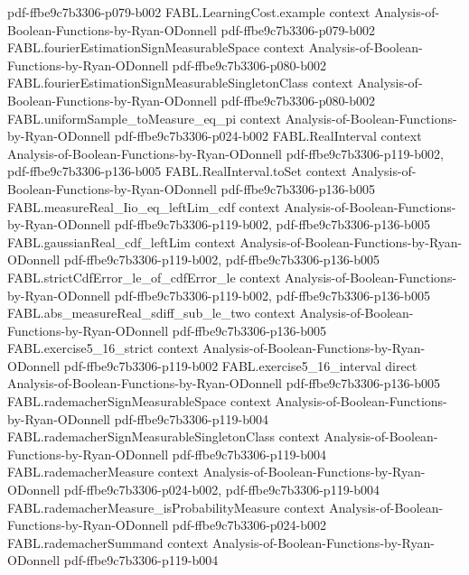 \begin{theorem}
  {pdf-ffbe9c7b3306-p079-b002}
\proofstep
  {FABL.LearningCost.example}
  {context}
  {Analysis-of-Boolean-Functions-by-Ryan-ODonnell}
  {pdf-ffbe9c7b3306-p079-b002}
\proofstep
  {FABL.fourierEstimationSignMeasurableSpace}
  {context}
  {Analysis-of-Boolean-Functions-by-Ryan-ODonnell}
  {pdf-ffbe9c7b3306-p080-b002}
\proofstep
  {FABL.fourierEstimationSignMeasurableSingletonClass}
  {context}
  {Analysis-of-Boolean-Functions-by-Ryan-ODonnell}
  {pdf-ffbe9c7b3306-p080-b002}
\proofstep
  {FABL.uniformSample_toMeasure_eq_pi}
  {context}
  {Analysis-of-Boolean-Functions-by-Ryan-ODonnell}
  {pdf-ffbe9c7b3306-p024-b002}
\proofstep
  {FABL.RealInterval}
  {context}
  {Analysis-of-Boolean-Functions-by-Ryan-ODonnell}
  {pdf-ffbe9c7b3306-p119-b002,
    pdf-ffbe9c7b3306-p136-b005}
\proofstep
  {FABL.RealInterval.toSet}
  {context}
  {Analysis-of-Boolean-Functions-by-Ryan-ODonnell}
  {pdf-ffbe9c7b3306-p136-b005}
\proofstep
  {FABL.measureReal_Iio_eq_leftLim_cdf}
  {context}
  {Analysis-of-Boolean-Functions-by-Ryan-ODonnell}
  {pdf-ffbe9c7b3306-p119-b002,
    pdf-ffbe9c7b3306-p136-b005}
\proofstep
  {FABL.gaussianReal_cdf_leftLim}
  {context}
  {Analysis-of-Boolean-Functions-by-Ryan-ODonnell}
  {pdf-ffbe9c7b3306-p119-b002,
    pdf-ffbe9c7b3306-p136-b005}
\proofstep
  {FABL.strictCdfError_le_of_cdfError_le}
  {context}
  {Analysis-of-Boolean-Functions-by-Ryan-ODonnell}
  {pdf-ffbe9c7b3306-p119-b002,
    pdf-ffbe9c7b3306-p136-b005}
\proofstep
  {FABL.abs_measureReal_sdiff_sub_le_two}
  {context}
  {Analysis-of-Boolean-Functions-by-Ryan-ODonnell}
  {pdf-ffbe9c7b3306-p136-b005}
\proofstep
  {FABL.exercise5_16_strict}
  {context}
  {Analysis-of-Boolean-Functions-by-Ryan-ODonnell}
  {pdf-ffbe9c7b3306-p119-b002}
\proofstep
  {FABL.exercise5_16_interval}
  {direct}
  {Analysis-of-Boolean-Functions-by-Ryan-ODonnell}
  {pdf-ffbe9c7b3306-p136-b005}
\proofstep
  {FABL.rademacherSignMeasurableSpace}
  {context}
  {Analysis-of-Boolean-Functions-by-Ryan-ODonnell}
  {pdf-ffbe9c7b3306-p119-b004}
\proofstep
  {FABL.rademacherSignMeasurableSingletonClass}
  {context}
  {Analysis-of-Boolean-Functions-by-Ryan-ODonnell}
  {pdf-ffbe9c7b3306-p119-b004}
\proofstep
  {FABL.rademacherMeasure}
  {context}
  {Analysis-of-Boolean-Functions-by-Ryan-ODonnell}
  {pdf-ffbe9c7b3306-p024-b002,
    pdf-ffbe9c7b3306-p119-b004}
\proofstep
  {FABL.rademacherMeasure_isProbabilityMeasure}
  {context}
  {Analysis-of-Boolean-Functions-by-Ryan-ODonnell}
  {pdf-ffbe9c7b3306-p024-b002}
\proofstep
  {FABL.rademacherSummand}
  {context}
  {Analysis-of-Boolean-Functions-by-Ryan-ODonnell}
  {pdf-ffbe9c7b3306-p119-b004}

\end{theorem}
